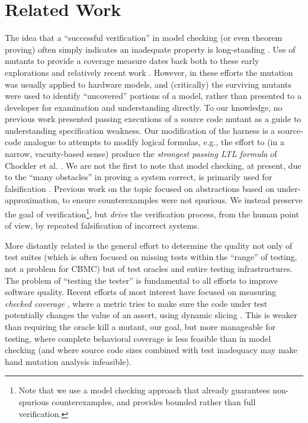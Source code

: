 \documentclass[conference]{IEEEtran}
\begin{document}
\section{Related Work}

The idea that a ``successful verification'' in model checking (or even
theorem proving) often simply indicates an inadequate property is
long-standing \cite{PracticalCov,Hoskote}. Use of mutants
\cite{MutSpec,MutCov} to provide a coverage measure dates back both to
these early explorations and relatively recent work \cite{MutInterp}.
However, in these efforts the mutation was usually applied to hardware
models, and (critically) the surviving mutants were used to identify
``uncovered'' portions of a model, rather than presented to a
developer for examination and understanding directly.  To our
knowledge, no previous work presented passing executions of a source
code mutant as a guide to understanding specification weakness.  Our
modification of the harness is a source-code analogue to attempts to
modify logical formulas, e.g., the effort to (in a narrow,
vacuity-based sense) produce the \emph{strongest passing LTL formula}
of Chockler et al. \cite{BeyondVac}.  We are not the first to note
that model checking, at present, due to the ``many obstacles'' in
proving a system correct, is primarily used for falsification
\cite{AbsFals}.  Previous work on the topic \cite{AbsFals} focused on
abstractions based on under-approximation, to ensure counterexamples
were not spurious. We instead preserve the goal of
verification\footnote{Note that we use a model checking approach that
  already guarantees non-spurious counterexamples, and provides
  bounded rather than full verification.}, but \emph{drive} the verification
process, from the human point of view, by repeated falsification of
incorrect systems.

More distantly related is the general effort to determine the quality
not only of test suites (which is often focused on missing tests
within the ``range'' of testing, not a problem for CBMC) but of test
oracles and entire testing infrastructures.  The problem of ``testing
the tester'' \cite{WODA09} is fundamental to all efforts
to improve software quality.  Recent efforts of most interest have
focused on measuring \emph{checked coverage} \cite{CheckedCov,CheckedJournal,ThereYet}, where
a metric tries to make sure the code under test potentially changes
the value of an assert, using dynamic slicing \cite{DynSlice,Tip}.  This is weaker than requiring the oracle kill
a mutant, our goal, but more manageable for testing, where complete
behavioral coverage is less feasible than in model checking (and where
source code sizes combined with test inadequacy may make hand mutation analysis infeasible).
\end{document}
